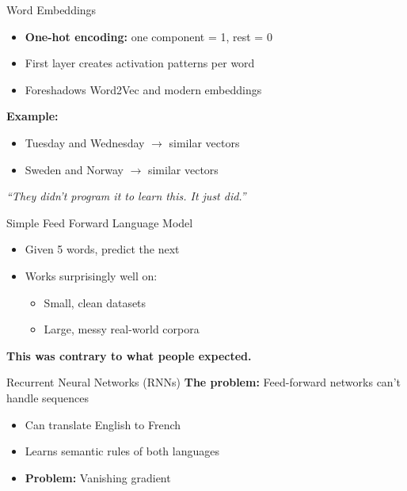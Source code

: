\begin{frame}{Word Embeddings}
    \begin{itemize}
        \item \textbf{One-hot encoding:} one component = 1, rest = 0
        \item First layer creates activation patterns per word
        \item Foreshadows Word2Vec and modern embeddings
    \end{itemize}
    
    \vspace{1em}
    \textbf{Example:}
    \begin{itemize}
        \item Tuesday and Wednesday $\rightarrow$ similar vectors
        \item Sweden and Norway $\rightarrow$ similar vectors
    \end{itemize}
    
    \vspace{1em}
    \textit{``They didn't program it to learn this. It just did.''}
\end{frame}

\begin{frame}{Simple Feed Forward Language Model}
    \begin{itemize}
        \item Given 5 words, predict the next
        \item Works surprisingly well on:
        \begin{itemize}
            \item Small, clean datasets
            \item Large, messy real-world corpora
        \end{itemize}
    \end{itemize}
    
    \vspace{1em}
    \textbf{This was contrary to what people expected.}
\end{frame}

\begin{frame}{Recurrent Neural Networks (RNNs)}
    \textbf{The problem:} Feed-forward networks can't handle sequences
    
    \vspace{1em}
    
    \begin{itemize}
        \item Can translate English to French
        \item Learns semantic rules of both languages
        \item \textbf{Problem:} Vanishing gradient
    \end{itemize}
\end{frame}

